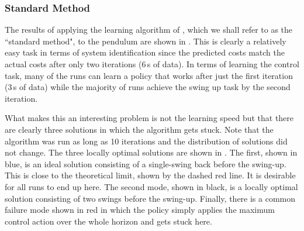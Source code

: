 \subsubsection{Standard Method}
The results of applying the learning algorithm of \cite{DR11}, which we shall refer to as the ``standard method", to the pendulum are shown in . This is clearly a relatively easy task in terms of system identification since the predicted costs match the actual costs after only two iterations (6$\,$s of data). In terms of learning the control task, many of the runs can learn a policy that works after just the first iteration (3$\,$s of data) while the majority of runs achieve the swing up task by the second iteration.

What makes this an interesting problem is not the learning speed but that there are clearly three solutions in which the algorithm gets stuck. Note that the algorithm was run as long as 10 iterations and the distribution of solutions did not change. The three locally optimal solutions are shown in . The first, shown in blue, is an ideal solution consisting of a single-swing back before the swing-up. This is close to the theoretical limit, shown by the dashed red line.
It is desirable for all runs to end up here. The second mode, shown in black, is a locally optimal solution consisting of two swings before the swing-up. Finally, there is a common failure mode shown in red in which the policy simply applies the maximum control action over the whole horizon and gets stuck here.








